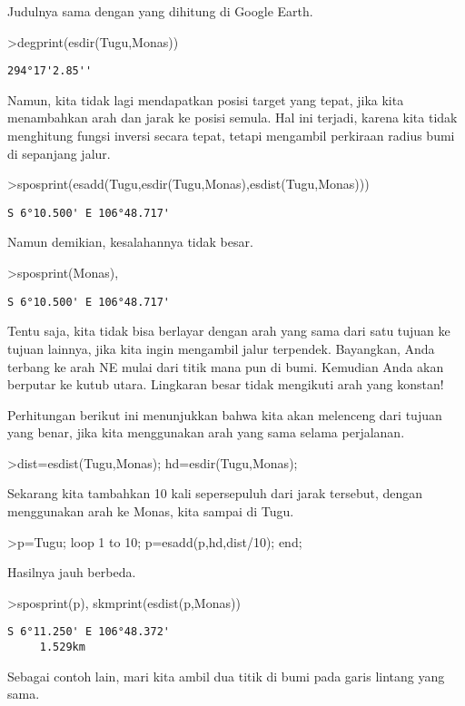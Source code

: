 \documentclass[
]{book}
\begin{document}
Judulnya sama dengan yang dihitung di Google Earth.

\textgreater degprint(esdir(Tugu,Monas))

\begin{verbatim}
294°17'2.85''
\end{verbatim}

Namun, kita tidak lagi mendapatkan posisi target yang tepat, jika kita menambahkan arah dan jarak ke posisi semula. Hal ini terjadi, karena kita tidak menghitung fungsi inversi secara tepat, tetapi mengambil perkiraan radius bumi di sepanjang jalur.

\textgreater sposprint(esadd(Tugu,esdir(Tugu,Monas),esdist(Tugu,Monas)))

\begin{verbatim}
S 6°10.500' E 106°48.717'
\end{verbatim}

Namun demikian, kesalahannya tidak besar.

\textgreater sposprint(Monas),

\begin{verbatim}
S 6°10.500' E 106°48.717'
\end{verbatim}

Tentu saja, kita tidak bisa berlayar dengan arah yang sama dari satu tujuan ke tujuan lainnya, jika kita ingin mengambil jalur terpendek. Bayangkan, Anda terbang ke arah NE mulai dari titik mana pun di bumi. Kemudian Anda akan berputar ke kutub utara. Lingkaran besar tidak mengikuti arah yang konstan!

Perhitungan berikut ini menunjukkan bahwa kita akan melenceng dari tujuan yang benar, jika kita menggunakan arah yang sama selama perjalanan.

\textgreater dist=esdist(Tugu,Monas); hd=esdir(Tugu,Monas);

Sekarang kita tambahkan 10 kali sepersepuluh dari jarak tersebut, dengan menggunakan arah ke Monas, kita sampai di Tugu.

\textgreater p=Tugu; loop 1 to 10; p=esadd(p,hd,dist/10); end;

Hasilnya jauh berbeda.

\textgreater sposprint(p), skmprint(esdist(p,Monas))

\begin{verbatim}
S 6°11.250' E 106°48.372'
     1.529km
\end{verbatim}

Sebagai contoh lain, mari kita ambil dua titik di bumi pada garis lintang yang sama.
\end{document}
